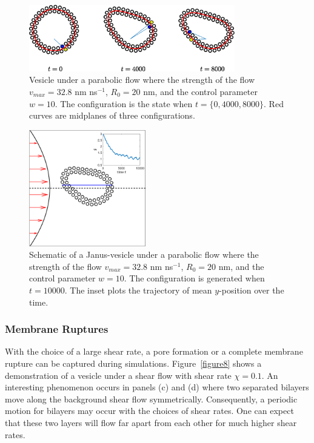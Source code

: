\documentclass[lineno]{jfm}
\begin{document}
\begin{figure}
\centering
\includegraphics[width=0.8\textwidth]{slipper.eps}
  \caption{Vesicle under a parabolic flow where the strength of the flow $v_{max}=32.8$ nm ns$^{-1}$, $R_0 = 20$ nm,  and the control parameter $w=10$. The configuration is the state when $t=\{0, 4000, 8000\}$. Red curves are midplanes of three configurations. 
  }
    \label{figure6}
\end{figure}


\begin{figure}
\centering
\includegraphics[height=2in]{parabolic.eps}
  \caption{Schematic of a Janus-vesicle under a parabolic flow where the strength of the flow $v_{max}=32.8$ nm ns$^{-1}$, $R_0 = 20$ nm,  and the control parameter $w=10$. The configuration is generated when $t=10000$. The inset plots the trajectory of mean $y$-position over the time.
  }
    \label{figure7}
\end{figure}




\subsubsection{Membrane Ruptures}


With the choice of a large shear rate, a pore formation or a complete membrane rupture can be captured during simulations. Figure~\ref{figure8} shows a demonstration of a vesicle under a shear flow with shear rate $\chi=0.1$. An interesting phenomenon occurs in panels (c) and (d) where two separated bilayers move along the background shear flow symmetrically. Consequently, a periodic motion for bilayers may occur 
with the choices of shear rates. One can expect that these two layers will flow far apart from each other for much higher shear rates.
\end{document}
